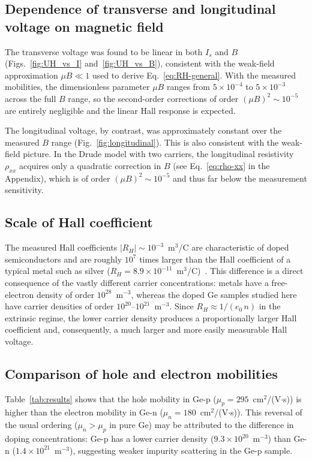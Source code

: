 \documentclass[%
 reprint,
 amsmath,amssymb,
 aps,
]{revtex4-2}
\begin{document}
\subsection{Dependence of transverse and longitudinal voltage on magnetic field}

The transverse voltage was found to be linear in both $I_s$ and $B$ (Figs.~\ref{fig:UH_vs_I} and~\ref{fig:UH_vs_B}), consistent with the weak-field approximation $\mu B \ll 1$ used to derive Eq.~\eqref{eq:RH-general}. With the measured mobilities, the dimensionless parameter $\mu B$ ranges from $5 \times 10^{-4}$ to $5 \times 10^{-3}$ across the full $B$ range, so the second-order corrections of order $(\mu B)^2 \sim 10^{-5}$ are entirely negligible and the linear Hall response is expected.

The longitudinal voltage, by contrast, was approximately constant over the measured $B$ range (Fig.~\ref{fig:longitudinal}). This is also consistent with the weak-field picture. In the Drude model with two carriers, the longitudinal resistivity $\rho_{xx}$ acquires only a quadratic correction in $B$ (see Eq.~\eqref{eq:rho-xx} in the Appendix), which is of order $(\mu B)^2 \sim 10^{-5}$ and thus far below the measurement sensitivity.


\subsection{Scale of Hall coefficient}

The measured Hall coefficients $|R_H| \sim 10^{-3}$~m$^3$/C are characteristic of doped semiconductors and are roughly $10^7$ times larger than the Hall coefficient of a typical metal such as silver ($R_H = 8.9 \times 10^{-11}$~m$^3$/C)~\cite{ashcroft1976}. This difference is a direct consequence of the vastly different carrier concentrations: metals have a free-electron density of order $10^{28}$~m$^{-3}$, whereas the doped Ge samples studied here have carrier densities of order $10^{20}$--$10^{21}$~m$^{-3}$. Since $R_H \approx 1/(e_0 \, n)$ in the extrinsic regime, the lower carrier density produces a proportionally larger Hall coefficient and, consequently, a much larger and more easily measurable Hall voltage.


\subsection{Comparison of hole and electron mobilities}

Table~\ref{tab:results} shows that the hole mobility in Ge-p ($\mu_p = 295$~cm$^2$/(V$\cdot$s)) is higher than the electron mobility in Ge-n ($\mu_n = 180$~cm$^2$/(V$\cdot$s)). This reversal of the usual ordering ($\mu_n > \mu_p$ in pure Ge) may be attributed to the difference in doping concentrations: Ge-p has a lower carrier density ($9.3 \times 10^{20}$~m$^{-3}$) than Ge-n ($1.4 \times 10^{21}$~m$^{-3}$), suggesting weaker impurity scattering in the Ge-p sample.
\end{document}
